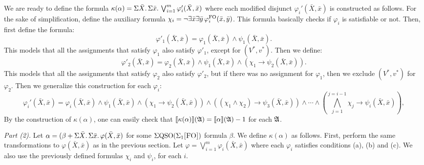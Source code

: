 We are ready to define the formula  $\kappa(\alpha) = \Sigma{\bar{X}}.\,\Sigma{\bar{x}}.\, \bigvee_{i = 1}^m\varphi_i'(\bar{X},\bar{x})$
where each modified disjunct $\varphi_i'(\bar{X},\bar{x})$ is constructed as follows. 
For the sake of simplification, define the auxiliary formula $\chi_i = \neg\exists\bar{x}\exists\bar{y}\,\varphi^{{\rm FO}}_i(\bar{x},\bar{y})$. 
This formula basically checks if $\varphi_i$ is satisfiable or not.
Then, first define the formula:
$$
\varphi'_1(\bar{X},\bar{x}) = \varphi_1(\bar{X},\bar{x})\wedge\psi_1(\bar{X},\bar{x}).
$$
This models that all the assignments that satisfy $\varphi_1$ also satisfy $\varphi'_1$, except for $(V^*,v^*)$. Then we define:
$$
\varphi'_2(\bar{X},\bar{x}) = \varphi_2(\bar{X},\bar{x})\wedge\psi_1(\bar{X},\bar{x})\wedge(\chi_1\to\psi_2(\bar{X},\bar{x})).
$$
This models that all the assignments that satisfy $\varphi_2$ also satisfy $\varphi'_2$, but if there was no assignment for $\varphi_1$, then we exclude $(V^*,v^*)$ for $\varphi_2$. Then we generalize this construction for each $\varphi_i$:
$$
\varphi_i'(\bar{X},\bar{x}) = \varphi_i(\bar{X},\bar{x})\wedge\psi_1(\bar{X},\bar{x})\wedge(\chi_1\to\psi_2(\bar{X},\bar{x}))\wedge((\chi_1\wedge\chi_2)\to\psi_3(\bar{X},\bar{x}))\wedge\cdots\wedge(
\bigwedge_{j = 1}^{j = i-1}\chi_j\to\psi_i(\bar{X},\bar{x})),
$$
By the construction of $\kappa(\alpha)$, one can easily check that  ${\llbracket{}{\kappa(\alpha)}\rrbracket}(\mathfrak{A}) = {\llbracket{}{\alpha}\rrbracket}(\mathfrak{A})-1$ for each $\mathfrak{A}$.

\vspace{1em}

{\em Part (2).} Let $\alpha = (\beta + \Sigma{\bar{X}}.\,\Sigma{\bar{x}}.\, \varphi(\bar{X},\bar{x})$ for some $\Sigma{\rm QSO}(\Sigma_{1}\textsc{[FO]})$ formula $\beta$. We define $\kappa(\alpha)$ as follows.
First, perform the same transformations to $\varphi(\bar{X},\bar{x})$ as in the previous section. Let $\varphi = \bigvee_{i = 1}^m\varphi_i(\bar{X},\bar{x})$ where each $\varphi_i$ satisfies conditions (a), (b) and (c). We also use the previously defined formulas $\chi_i$ and $\psi_i$, for each $i$. 

